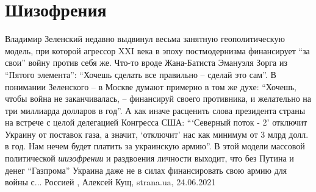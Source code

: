  
 
 
 
 
\chapter{Шизофрения}
\label{sec:slova.shizofrenia}

Владимир Зеленский недавно выдвинул весьма занятную геополитическую модель, при
которой агрессор XXI века в эпоху постмодернизма финансирует \enquote{за свои}
войну против себя же. Что-то вроде Жана-Батиста Эмануэля Зорга из
\enquote{Пятого элемента}: \enquote{Хочешь сделать все правильно – сделай это
сам}.  В понимании Зеленского – в Москве думают примерно в том же духе:
\enquote{Хочешь, чтобы война не заканчивалась, – финансируй своего противника,
и желательно на три миллиарда долларов в год}.  А как иначе расценить слова
президента страны на встрече с целой делегацией Конгресса США:
\enquote{\enquote{Северный поток - 2} отключит Украину от поставок газа, а
значит, \enquote{отключит} нас как минимум от 3 млрд долл. в год. Нам нечем
будет платить за украинскую армию}.  В этой модели массовой политической
\emph{шизофрении} и раздвоения личности выходит, что без Путина и денег
\enquote{Газпрома} Украина даже не в силах финансировать свою армию для войны
с... Россией
, 
Алексей Кущ, strana.ua, 24.06.2021


